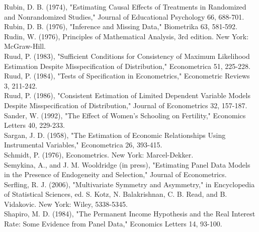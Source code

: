 \documentclass[10pt]{article}
\begin{document}
Rubin, D. B. (1974), "Estimating Causal Effects of Treatments in Randomized and Nonrandomized Studies," Journal of Educational Psychology 66, 688-701.\\
Rubin, D. B. (1976), "Inference and Missing Data," Biometrika 63, 581-592.\\
Rudin, W. (1976), Principles of Mathematical Analysis, 3rd edition. New York: McGraw-Hill.\\
Ruud, P. (1983), "Sufficient Conditions for Consistency of Maximum Likelihood Estimation Despite Misspecification of Distribution," Econometrica 51, 225-228.\\
Ruud, P. (1984), "Tests of Specification in Econometrics," Econometric Reviews 3, 211-242.\\
Ruud, P. (1986), "Consistent Estimation of Limited Dependent Variable Models Despite Misspecification of Distribution," Journal of Econometrics 32, 157-187.\\
Sander, W. (1992), "The Effect of Women's Schooling on Fertility," Economics Letters 40, 229-233.\\
Sargan, J. D. (1958), "The Estimation of Economic Relationships Using Instrumental Variables," Econometrica 26, 393-415.\\
Schmidt, P. (1976), Econometrics. New York: Marcel-Dekker.\\
Semykina, A., and J. M. Wooldridge (in press), "Estimating Panel Data Models in the Presence of Endogeneity and Selection," Journal of Econometrics.\\
Serfling, R. J. (2006), "Multivariate Symmetry and Asymmetry," in Encyclopedia of Statistical Sciences, ed. S. Kotz, N. Balakrishnan, C. B. Read, and B. Vidakovic. New York: Wiley, 5338-5345.\\
Shapiro, M. D. (1984), "The Permanent Income Hypothesis and the Real Interest Rate: Some Evidence from Panel Data," Economics Letters 14, 93-100.
\end{document}
